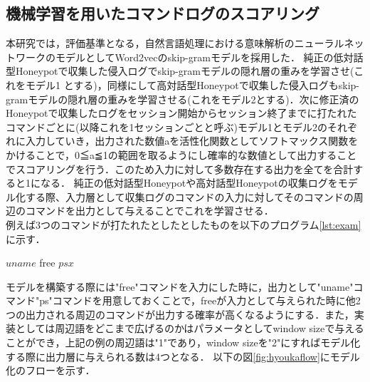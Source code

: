 \subsection{機械学習を用いたコマンドログのスコアリング}
\label{eval:impl}
本研究では，評価基準となる，自然言語処理における意味解析のニューラルネットワークのモデルとしてWord2vecのskip-gramモデルを採用した．
純正の低対話型Honeypotで収集した侵入ログでskip-gramモデルの隠れ層の重みを学習させ(これをモデル1
とする)，同様にして高対話型Honeypotで収集した侵入ログもskip-gramモデルの隠れ層の重みを学習させる(これをモデル2とする)．次に修正済のHoneypotで収集したログをセッション開始からセッション終了までに打たれたコマンドごとに(以降これを1セッションごとと呼ぶ)モデル1とモデル2のそれぞれに入力していき，出力された数値aを活性化関数としてソフトマックス関数をかけることで，0≦a≦1の範囲を取るようにし確率的な数値として出力することでスコアリングを行う．このため入力に対して多数存在する出力を全てを合計すると1になる．
純正の低対話型Honeypotや高対話型Honeypotの収集ログをモデル化する際、入力層として収集ログのコマンドの入力に対してそのコマンドの周辺のコマンドを出力として与えることでこれを学習させる．\\
例えば3つのコマンドが打たれたとしたとしたものを以下のプログラム\ref{lst:exam}に示す．

\vspace{5mm}
\begin{mylisting}[label=exam,language=sh,caption=3つの実行コマンドの例]
 $ uname
 $ free
 $ ps x
 $
\end{mylisting}
\vspace{5mm}

モデルを構築する際には"free"コマンドを入力にした時に，出力として"uname"コマンド"ps"コマンドを用意しておくことで，freeが入力として与えられた時に他2つの出力される周辺のコマンドが出力する確率が高くなるようにする．また，実装としては周辺語をどこまで広げるのかはパラメータとしてwindow sizeで与えることができ，上記の例の周辺語は"1"であり，window sizeを"2"にすればモデル化する際に出力層に与えられる数は4つとなる．
以下の図\ref{fig:hyoukaflow}にモデル化のフローを示す．\\


